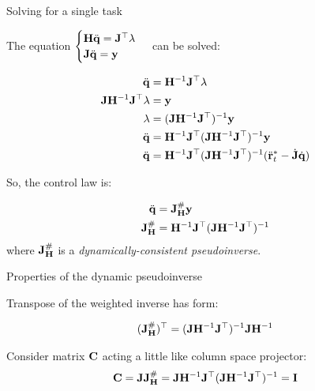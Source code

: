 \documentclass{beamer}
\newcommand{\iH} {\mathbf{H}^{-1}}
\newcommand{\JH} {\bo{J}^\#_\bo{H}}
\begin{document}
\begin{frame}{Solving for a single task}
	\begin{flushleft}
		
		The equation $\begin{cases}
			\mathbf{H} \ddot{\mathbf{q}}  =  \mathbf{J}^\top \lambda \\
			\mathbf{J}\ddot{\mathbf{q}}    = \mathbf{y}
		\end{cases}$ can be solved:
		
		\begin{align}
			\ddot{\mathbf{q}}  &=  \mathbf{H}^{-1}\mathbf{J}^\top \lambda  
			\\
			\mathbf{J}\mathbf{H}^{-1}\mathbf{J}^\top \lambda    &= \mathbf{y} 
			\\
			 \lambda    &= (\mathbf{J}\mathbf{H}^{-1}\mathbf{J}^\top)^{-1}\mathbf{y} 
			 \\
			 \ddot{\mathbf{q}}  &=  \mathbf{H}^{-1}\mathbf{J}^\top (\mathbf{J}\mathbf{H}^{-1}\mathbf{J}^\top)^{-1}\mathbf{y} 
			 \\
			 \ddot{\mathbf{q}}  &=  \mathbf{H}^{-1}\mathbf{J}^\top (\mathbf{J}\mathbf{H}^{-1}\mathbf{J}^\top)^{-1}
			 (\ddot{\mathbf{r}}^*_t - \dot{\mathbf{J}} \dot{\mathbf{q}})
		\end{align}		
		
		So, the control law is:
		
		\begin{align}
			\ddot{\mathbf{q}} &= \mathbf{J}^\#_{\mathbf{H}}  \mathbf{y} \\
			\mathbf{J}^\#_{\mathbf{H}} &= \mathbf{H}^{-1}\mathbf{J}^\top (\mathbf{J}\mathbf{H}^{-1}\mathbf{J}^\top)^{-1}
		\end{align}
	where $\mathbf{J}^\#_{\mathbf{H}}$ is a \emph{dynamically-consistent pseudoinverse}.
		
	\end{flushleft}
\end{frame}




\begin{frame}{Properties of the dynamic pseudoinverse}
	\begin{flushleft}
		
		Transpose of the weighted inverse has form:
		
		\begin{align}
			(\JH)\T = (\bo{J} \iH \bo{J}\T)^{-1} \bo{J} \iH
		\end{align}
		
		Consider matrix $\mathbf{C}$ acting a little like column space projector:
		\begin{align}
			\bo{C} = \bo{J} \JH = \bo{J} \iH \bo{J}\T (\bo{J} \iH \bo{J}\T)^{-1}  = \bo{I}
		\end{align}
		
	\end{flushleft}
\end{frame}
\end{document}
